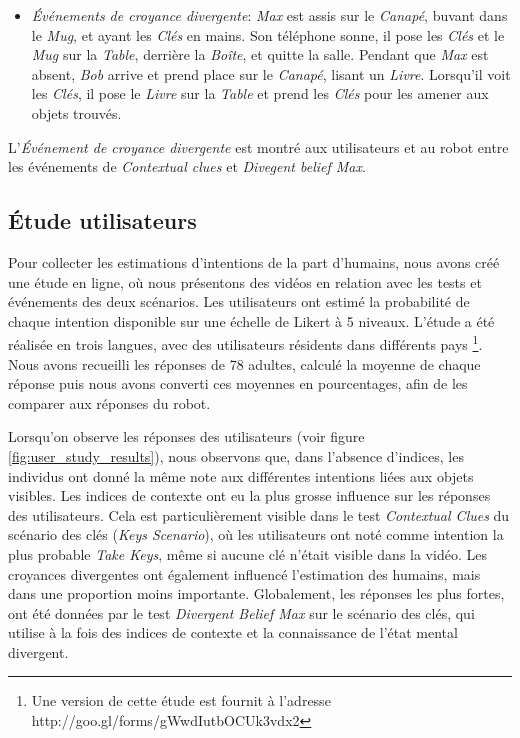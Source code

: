 \documentclass[a4paper,11pt,twoside]{StyleThese}
\begin{document}
\begin{itemize}
\item \textit{Événements de croyance divergente}: \textit{Max} est assis sur le \textit{Canapé}, buvant dans le \textit{Mug}, et ayant les \textit{Clés} en mains. Son téléphone sonne, il pose les \textit{Clés} et le \textit{Mug} sur la \textit{Table}, derrière la \textit{Boîte}, et quitte la salle. Pendant que \textit{Max} est absent, \textit{Bob} arrive et prend place sur le \textit{Canapé}, lisant un \textit{Livre}. Lorsqu'il voit les \textit{Clés}, il pose le \textit{Livre} sur la \textit{Table} et prend les \textit{Clés} pour les amener aux objets trouvés.
\end{itemize}

L'\textit{Événement de croyance divergente} est montré aux utilisateurs et au robot entre les événements de \textit{Contextual clues} et \textit{Divegent belief Max}.

\subsection{Étude utilisateurs}
Pour collecter les estimations d'intentions de la part d'humains, nous avons créé une étude en ligne, où nous présentons des vidéos en relation avec les tests et événements des deux scénarios. Les utilisateurs ont estimé la probabilité de chaque intention disponible sur une échelle de Likert à 5 niveaux. L'étude a été réalisée en trois langues, avec des utilisateurs résidents dans différents pays \footnote{Une version de cette étude est fournit à l'adresse http://goo.gl/forms/gWwdIutbOCUk3vdx2}. Nous avons recueilli les réponses de 78 adultes, calculé la moyenne de chaque réponse puis nous avons converti ces moyennes en pourcentages, afin de les comparer aux réponses du robot.

Lorsqu'on observe les réponses des utilisateurs (voir figure \ref{fig:user_study_results}), nous observons que, dans l'absence d'indices, les individus ont donné la même note aux différentes intentions liées aux objets visibles. Les indices de contexte ont eu la plus grosse influence sur les réponses des utilisateurs. Cela est particulièrement visible dans le test \textit{Contextual Clues} du scénario des clés (\textit{Keys Scenario}), où les utilisateurs ont noté comme intention la plus probable \textit{Take Keys}, même si aucune clé n'était visible dans la vidéo. Les croyances divergentes ont également influencé l'estimation des humains, mais dans une proportion moins importante. Globalement, les réponses les plus fortes, ont été données par le test \textit{Divergent Belief Max} sur le scénario des clés, qui utilise à la fois des indices de contexte et la connaissance de l'état mental divergent.
\end{document}
